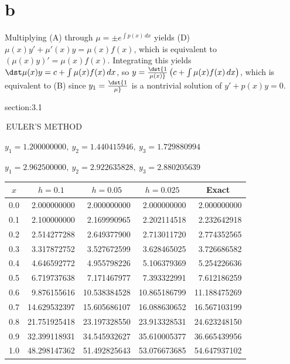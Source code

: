 \documentclass[dvips]{book}
\renewcommand{\exer}[1]{\par\medskip\;\noindent{\color{red}\bf #1.}}
\numberwithin{example}{section}
\numberwithin{equation}{section}
\numberwithin{theorem}{section}
\numberwithin{table}{section}
\numberwithin{figure}{section}
\begin{document}
\part{b}  Multiplying (A) through $\mu=\pm e^{\int p(x)\,dx}$
yields  (D) $\mu(x)y'+\mu'(x)y=\mu(x)f(x)$, which is equivalent to
$(\mu(x)y)'=\mu(x)f(x)$. Integrating this yields
$\dst\mu(x)y=c+\int\mu(x)f(x)\,dx$, so
$y=\dst{1\over\mu(x)}\left(c+\int
\mu(x)f(x)\,dx\right)$, which  is equivalent to (B) since
$y_1=\dst{1\over\mu}$ is a nontrivial solution of $y'+p(x)y=0$.


\newpage
\thispagestyle{empty}

\setcounter{chapter}{3}

 {section:3.1}

\renewcommand{\thissection}{\sectiontitle
{\,EULER'S METHOD}}
\thissection

\vspace*{-15pt}



\exer{3.1.2}
$y_1=1.200000000,\ y_2=1.440415946,\ y_3=1.729880994$

\exer{3.1.4}
$y_1=2.962500000,\ y_2=2.922635828,\ y_3=2.880205639$


\exer{3.1.6}
{\small
\begin{tabular}{|c|r|r|r|r|}\hline
\multicolumn{1}{|c|}{$x$}&
\multicolumn{1}{|c|}{$h=0.1$}&
\multicolumn{1}{|c|}{$h=0.05$}&
\multicolumn{1}{|c|}{$h=0.025$}&
\multicolumn{1}{|c|}{Exact}\\ \hline
0.0 &  2.000000000 &   2.000000000 &  2.000000000 &   2.000000000 \\
0.1 &  2.100000000 &   2.169990965 &  2.202114518 &   2.232642918 \\
0.2 &  2.514277288 &   2.649377900 &  2.713011720 &   2.774352565 \\
0.3 &  3.317872752 &   3.527672599 &  3.628465025 &   3.726686582 \\
0.4 &  4.646592772 &   4.955798226 &  5.106379369 &   5.254226636 \\
0.5 &  6.719737638 &   7.171467977 &  7.393322991 &   7.612186259 \\
0.6 &  9.876155616 &  10.538384528 & 10.865186799 &  11.188475269 \\
0.7 & 14.629532397 &  15.605686107 & 16.088630652 &  16.567103199 \\
0.8 & 21.751925418 &  23.197328550 & 23.913328531 &  24.623248150 \\
0.9 & 32.399118931 &  34.545932627 & 35.610005377 &  36.665439956 \\
1.0 & 48.298147362 &  51.492825643 & 53.076673685 &  54.647937102 \\
\hline
\end{tabular}}
\end{document}
